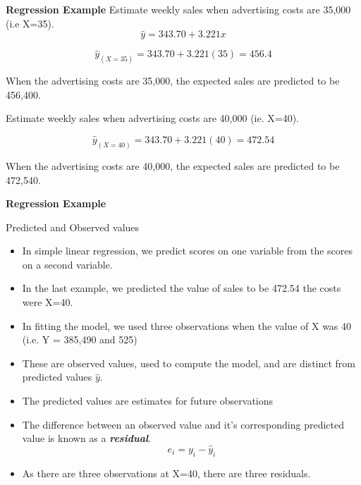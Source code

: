 \documentclass[]{report}
\begin{document}

	
	
	\textbf{Regression Example}
	Estimate weekly sales when advertising costs are 35,000 (i.e X=35).
	\[ \hat{y} = 343.70 + 3.221x \]
	
	\[ \hat{y}_{(X=35)} = 343.70 + 3.221(35)  = 456.4 \]
	
	When the advertising costs are 35,000, the expected sales are predicted to be 456,400.
	
	Estimate weekly sales when advertising costs are 40,000 (ie. X=40).
	
	
	\[ \hat{y}_{(X=40)} = 343.70 + 3.221(40)  = 472.54 \]
	
	When the advertising costs are 40,000, the expected sales are predicted to be 472,540.
	
	
	\textbf{Regression Example}
	
	Predicted and Observed values
	\begin{itemize}
		\item In simple linear regression, we predict scores on one variable from the scores on a second variable.
		\item In the last example, we predicted the value of sales to be 472.54 the costs were X=40.
		\item In fitting the model, we used three observations when the value of X was 40 (i.e. Y = 385,490 and 525)
		\item These are observed values, used to compute the model, and are distinct from predicted values $\hat{y}$.
		\item The predicted values are estimates for future observations
		\item The difference between an observed value and it's corresponding predicted value is known as a \textbf{\textit{residual}}.
		\[e_i = y_i-\hat{y}_i \]
		\item As there are three observations at X=40, there are three residuals.
	\end{itemize}
	
	
%	
%	
	
\end{document}
